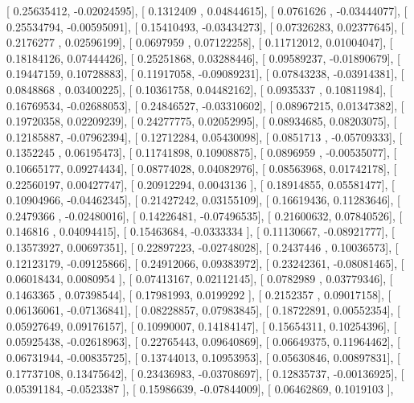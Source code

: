 \documentclass{article}
\begin{document}
       [ 0.25635412, -0.02024595],
       [ 0.1312409 ,  0.04844615],
       [ 0.0761626 , -0.03444077],
       [ 0.25534794, -0.00595091],
       [ 0.15410493, -0.03434273],
       [ 0.07326283,  0.02377645],
       [ 0.2176277 ,  0.02596199],
       [ 0.0697959 ,  0.07122258],
       [ 0.11712012,  0.01004047],
       [ 0.18184126,  0.07444426],
       [ 0.25251868,  0.03288446],
       [ 0.09589237, -0.01890679],
       [ 0.19447159,  0.10728883],
       [ 0.11917058, -0.09089231],
       [ 0.07843238, -0.03914381],
       [ 0.0848868 ,  0.03400225],
       [ 0.10361758,  0.04482162],
       [ 0.0935337 ,  0.10811984],
       [ 0.16769534, -0.02688053],
       [ 0.24846527, -0.03310602],
       [ 0.08967215,  0.01347382],
       [ 0.19720358,  0.02209239],
       [ 0.24277775,  0.02052995],
       [ 0.08934685,  0.08203075],
       [ 0.12185887, -0.07962394],
       [ 0.12712284,  0.05430098],
       [ 0.0851713 , -0.05709333],
       [ 0.1352245 ,  0.06195473],
       [ 0.11741898,  0.10908875],
       [ 0.0896959 , -0.00535077],
       [ 0.10665177,  0.09274434],
       [ 0.08774028,  0.04082976],
       [ 0.08563968,  0.01742178],
       [ 0.22560197,  0.00427747],
       [ 0.20912294,  0.0043136 ],
       [ 0.18914855,  0.05581477],
       [ 0.10904966, -0.04462345],
       [ 0.21427242,  0.03155109],
       [ 0.16619436,  0.11283646],
       [ 0.2479366 , -0.02480016],
       [ 0.14226481, -0.07496535],
       [ 0.21600632,  0.07840526],
       [ 0.146816  ,  0.04094415],
       [ 0.15463684, -0.0333334 ],
       [ 0.11130667, -0.08921777],
       [ 0.13573927,  0.00697351],
       [ 0.22897223, -0.02748028],
       [ 0.2437446 ,  0.10036573],
       [ 0.12123179, -0.09125866],
       [ 0.24912066,  0.09383972],
       [ 0.23242361, -0.08081465],
       [ 0.06018434,  0.0080954 ],
       [ 0.07413167,  0.02112145],
       [ 0.0782989 ,  0.03779346],
       [ 0.1463365 ,  0.07398544],
       [ 0.17981993,  0.0199292 ],
       [ 0.2152357 ,  0.09017158],
       [ 0.06136061, -0.07136841],
       [ 0.08228857,  0.07983845],
       [ 0.18722891,  0.00552354],
       [ 0.05927649,  0.09176157],
       [ 0.10990007,  0.14184147],
       [ 0.15654311,  0.10254396],
       [ 0.05925438, -0.02618963],
       [ 0.22765443,  0.09640869],
       [ 0.06649375,  0.11964462],
       [ 0.06731944, -0.00835725],
       [ 0.13744013,  0.10953953],
       [ 0.05630846,  0.00897831],
       [ 0.17737108,  0.13475642],
       [ 0.23436983, -0.03708697],
       [ 0.12835737, -0.00136925],
       [ 0.05391184, -0.0523387 ],
       [ 0.15986639, -0.07844009],
       [ 0.06462869,  0.1019103 ],
\end{document}
